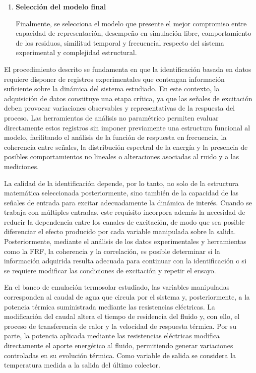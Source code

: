 \documentclass[11pt]{report}
\begin{document}
\begin{enumerate}
De esta forma, la selección no se basa únicamente en una métrica global de ajuste, sino también en la capacidad del modelo para representar la dinámica relevante del proceso y en la existencia o ausencia de información significativa remanente en los residuos.


    
    \item \textbf{Selección del modelo final}
  
    
    Finalmente, se selecciona el modelo que presente el mejor compromiso entre capacidad de representación, desempeño en simulación libre, comportamiento de los residuos, similitud temporal y frecuencial respecto del sistema experimental y complejidad estructural.
    
    
    
    
\end{enumerate}

El procedimiento descrito se fundamenta en que la identificación basada en datos requiere disponer de registros experimentales que contengan información suficiente sobre la dinámica del sistema estudiado. En este contexto, la adquisición de datos constituye una etapa crítica, ya que las señales de excitación deben provocar variaciones observables y representativas de la respuesta del proceso. Las herramientas de análisis no paramétrico permiten evaluar directamente estos registros sin imponer previamente una estructura funcional al modelo, facilitando el análisis de la función de respuesta en frecuencia, la coherencia entre señales, la distribución espectral de la energía y la presencia de posibles comportamientos no lineales o alteraciones asociadas al ruido y a las mediciones.

La calidad de la identificación depende, por lo tanto, no solo de la estructura matemática seleccionada posteriormente, sino también de la capacidad de las señales de entrada para excitar adecuadamente la dinámica de interés. Cuando se trabaja con múltiples entradas, este requisito incorpora además la necesidad de reducir la dependencia entre los canales de excitación, de modo que sea posible diferenciar el efecto producido por cada variable manipulada sobre la salida. Posteriormente, mediante el análisis de los datos experimentales y herramientas como la FRF, la coherencia y la correlación, es posible determinar si la información adquirida resulta adecuada para continuar con la identificación o si se requiere modificar las condiciones de excitación y repetir el ensayo.

En el banco de emulación termosolar estudiado, las variables manipuladas corresponden al caudal de agua que circula por el sistema y, posteriormente, a la potencia térmica suministrada mediante las resistencias eléctricas. La modificación del caudal altera el tiempo de residencia del fluido y, con ello, el proceso de transferencia de calor y la velocidad de respuesta térmica. Por su parte, la potencia aplicada mediante las resistencias eléctricas modifica directamente el aporte energético al fluido, permitiendo generar variaciones controladas en su evolución térmica. Como variable de salida se considera la temperatura medida a la salida del último colector.
\end{document}
